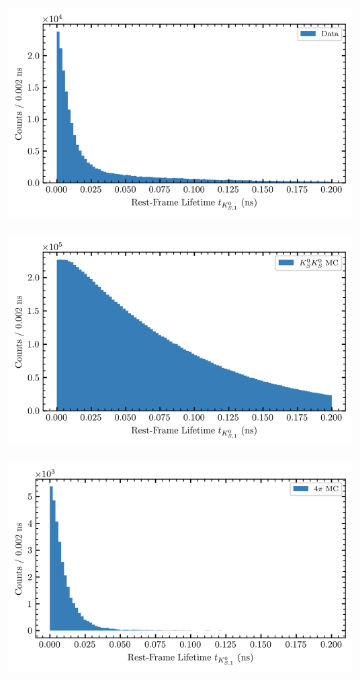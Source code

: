 \begin{figure}
  \begin{center}
    \begin{subfigure}[b]{.7\columnwidth}
      \includegraphics[width=1\linewidth]{figures/rfl_data_chisqdof_3.4.png}
      \caption{}
      \label{fig:rfl-data}
    \end{subfigure}
    \begin{subfigure}[b]{.7\columnwidth}
      \includegraphics[width=1\linewidth]{figures/rfl_accmc_chisqdof_3.4.png}
      \caption{}
      \label{fig:rfl-accmc}
    \end{subfigure}
    \begin{subfigure}[b]{.7\columnwidth}
      \includegraphics[width=1\linewidth]{figures/rfl_bkgmc_chisqdof_3.4.png}

\end{subfigure}
\end{center}
\end{figure}
